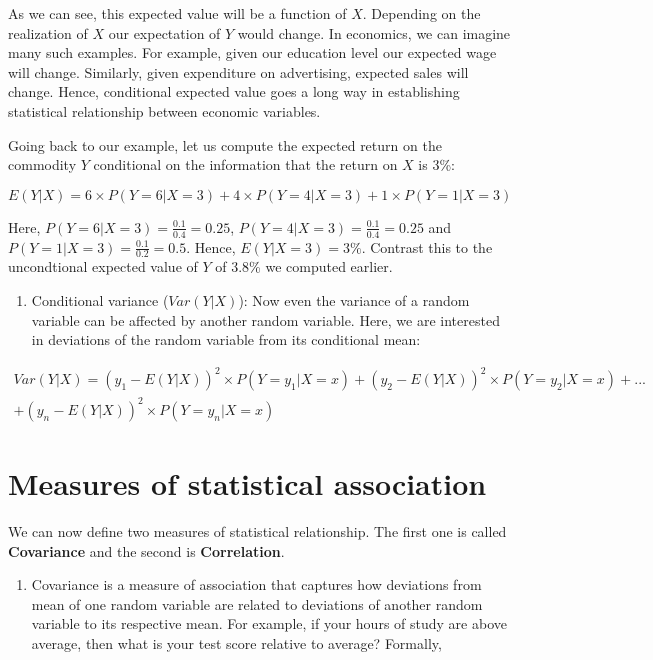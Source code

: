 \documentclass[]{book}
\providecommand{\tightlist}{%
  \setlength{\itemsep}{0pt}\setlength{\parskip}{0pt}}
\theoremstyle{definition}
\theoremstyle{definition}
\theoremstyle{definition}
\theoremstyle{remark}
\begin{document}
As we can see, this expected value will be a function of \(X\). Depending on the realization of \(X\) our expectation of \(Y\) would change. In economics, we can imagine many such examples. For example, given our education level our expected wage will change. Similarly, given expenditure on advertising, expected sales will change. Hence, conditional expected value goes a long way in establishing statistical relationship between economic variables.

Going back to our example, let us compute the expected return on the commodity \(Y\) conditional on the information that the return on \(X\) is 3\%:

\[E(Y|X) = 6 \times P(Y=6|X=3) + 4 \times P(Y=4|X=3) + 1 \times P(Y=1|X=3)\]

Here, \(P(Y=6|X=3)= \displaystyle\frac{0.1}{0.4}=0.25\), \(P(Y=4|X=3)= \displaystyle\frac{0.1}{0.4}=0.25\) and \(P(Y=1|X=3)= \displaystyle\frac{0.1}{0.2}=0.5\). Hence, \(E(Y|X=3)=3\%\). Contrast this to the uncondtional expected value of \(Y\) of 3.8\% we computed earlier.

\begin{enumerate}
\def\labelenumi{\arabic{enumi}.}
\setcounter{enumi}{1}
\tightlist
\item
  Conditional variance (\(Var(Y|X)\)): Now even the variance of a random variable can be affected by another random variable. Here, we are interested in deviations of the random variable from its conditional mean:
\end{enumerate}

\begin{align}
Var(Y|X) = (y_1 -E(Y|X))^2 \times P(Y=y_1|X=x) + (y_2 -E(Y|X))^2\times P(Y=y_2|X=x)+...\\ \nonumber
+ (y_n -E(Y|X))^2 \times P(Y=y_n|X=x)
\end{align}

\hypertarget{measures-of-statistical-association}{%
\section{Measures of statistical association}\label{measures-of-statistical-association}}

We can now define two measures of statistical relationship. The first one is called \textbf{Covariance} and the second is \textbf{Correlation}.

\begin{enumerate}
\def\labelenumi{\arabic{enumi}.}
\tightlist
\item
  Covariance is a measure of association that captures how deviations from mean of one random variable are related to deviations of another random variable to its respective mean. For example, if your hours of study are above average, then what is your test score relative to average? Formally,
\end{enumerate}
\end{document}
